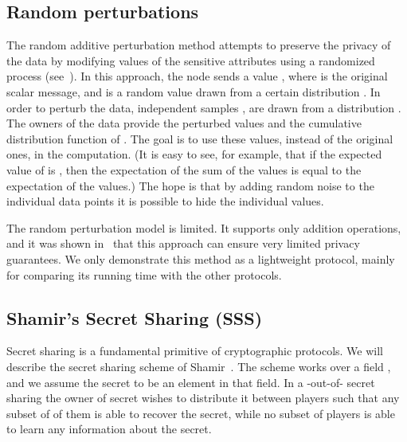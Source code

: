 \documentclass[times, 10pt,twocolumn]{article}
\begin{document}
\subsection{Random perturbations}
The random additive perturbation method attempts to preserve the
privacy of the data by modifying values of the sensitive
attributes using a randomized process
(see~\cite{AS,DiNi,RandomNoise}). In this approach, the node sends
a value , where  is the original scalar message, and
 is a random value drawn from a certain distribution . In
order to perturb the data,  independent samples , are drawn from a distribution . The owners of
the data provide the perturbed values  and the cumulative distribution function  of .
The goal is to use these values, instead of the original ones, in
the computation. (It is easy to see, for example, that if the
expected value of  is , then the expectation of the sum of
the  values is equal to the expectation of the 
values.) The hope is that by adding random noise to the individual
data points it is possible to hide the individual values.



The random perturbation model is limited. It supports only
addition operations, and it was shown in~\cite{DiNi} that this
approach can ensure very limited privacy guarantees. We only
demonstrate this method as a lightweight protocol, mainly for
comparing its running time with the other protocols.

\subsection{Shamir's Secret Sharing (SSS)}
Secret sharing is a fundamental primitive of cryptographic
protocols. We will describe the  secret sharing scheme of
Shamir~\cite{SSS}. The scheme works over a field , and we
assume the secret  to be an element in that field. In a
-out-of- secret sharing the owner of secret wishes to
distribute it between  players such that any subset of  of
them is able to recover the secret, while no subset of 
players is able to learn any information about the secret.
\end{document}
